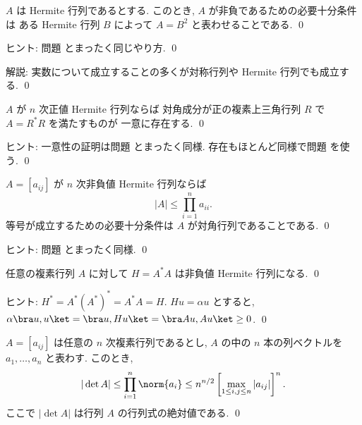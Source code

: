 \documentclass[12pt,twoside]{jarticle}
\begin{document}

\begin{question}
\label{q:positive-Hermitian}
  $A$ は Hermite 行列であるとする. 
  このとき, $A$ が非負であるための必要十分条件は
  ある Hermite 行列 $B$ によって $A=B^2$ と表わせることである. \qed
\end{question}

\noindent
ヒント: 問題  とまったく同じやり方.
\qed

\medskip
\noindent
解説: 実数について成立することの多くが対称行列や Hermite 行列でも成立する.
\qed


\begin{question}
\label{q:pos-Herm=RR}
  $A$ が $n$ 次正値 Hermite 行列ならば
  対角成分が正の複素上三角行列 $R$ で $A=R^*R$ を満たすものが
  一意に存在する.
  \qed
\end{question}

\noindent
ヒント: 一意性の証明は問題  とまったく同様. 
存在もほとんど同様で問題  を使う.
\qed


\begin{question}
\label{q:pre-Hadamard-complex}
  $A=[a_{ij}]$ が $n$ 次非負値 Hermite 行列ならば
  \begin{equation*}
    |A| \le \prod_{i=1}^n a_{ii}.
  \end{equation*}
  等号が成立するための必要十分条件は $A$ が対角行列であることである.
  \qed
\end{question}

\noindent
ヒント: 問題  とまったく同様.
\qed


\begin{question}
\label{q:H=AA}
  任意の複素行列 $A$ に対して $H=A^*A$ は非負値 Hermite 行列になる. \qed
\end{question}

\noindent
ヒント: $H^*=A^*(A^*)^*=A^*A=H$.  $Hu=\alpha u$ とすると,
$\alpha \bra u,u\ket = \bra u,Hu\ket = \bra Au,Au\ket \ge 0$.
\qed


\begin{question}
  $A=[a_{ij}]$ は任意の $n$ 次複素行列であるとし, 
  $A$ の中の $n$ 本の列ベクトルを $a_1,\dots,a_n$ と表わす.
  このとき,
  \begin{equation*}
    |\det A| 
    \le \prod_{i=1}^n \norm{a_i} 
    \le n^{n/2} \left[ \max_{1\le i,j\le n} |a_{ij}| \right]^n.
  \end{equation*}
  ここで $|\det A|$ は行列 $A$ の行列式の絶対値である. \qed
\end{question}
\end{document}
